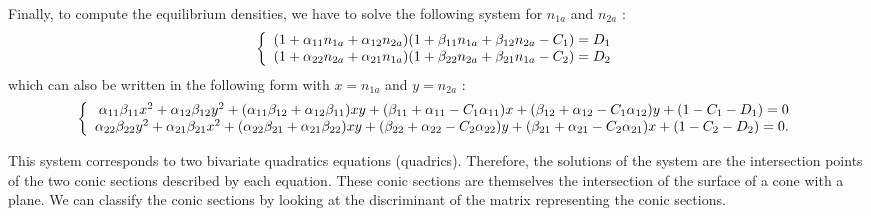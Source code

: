\documentclass{article}
\begin{document}
Finally, to compute the equilibrium densities, we have to solve the following system for $n_{1a}$ and $n_{2a}$ :
\begin{equation}
    \left\{
\begin{array}{r c l}
(1+\alpha_{11}n_{1a}+\alpha_{12}n_{2a})(1+\beta_{11}n_{1a}+\beta_{12}n_{2a}-C_1) = D_1\\
(1+\alpha_{22}n_{2a}+\alpha_{21}n_{1a})(1+\beta_{22}n_{2a}+\beta_{21}n_{1a}-C_2) = D_2
\end{array}
\right.
\end{equation}
which can also be written in the following form with $x=n_{1a}$ and $y=n_{2a}$ :
\begin{equation}
    \left\{
\begin{array}{r c l}
\alpha_{11}\beta_{11}x^2 + \alpha_{12}\beta_{12}y^2 + (\alpha_{11}\beta_{12}+\alpha_{12}\beta_{11})xy + (\beta_{11}+\alpha_{11}-C_1\alpha_{11})x+(\beta_{12}+\alpha_{12}-C_1\alpha_{12})y + (1-C_1-D_1) = 0\\
\alpha_{22}\beta_{22}y^2 + \alpha_{21}\beta_{21}x^2 + (\alpha_{22}\beta_{21}+\alpha_{21}\beta_{22})xy + (\beta_{22}+\alpha_{22}-C_2\alpha_{22})y+(\beta_{21}+\alpha_{21}-C_2\alpha_{21})x + (1-C_2-D_2) = 0.
\end{array}
\right.
\end{equation}

This system corresponds to two bivariate quadratics equations (quadrics). Therefore, the solutions of the system are the intersection points of the two conic sections described by each equation. These conic sections are themselves the intersection of the surface of a cone with a plane. We can classify the conic sections by looking at the discriminant of the matrix representing the conic sections.
\end{document}
